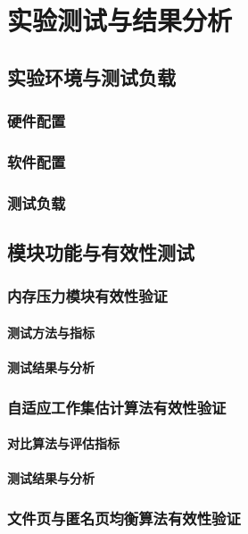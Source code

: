 \chapter{实验测试与结果分析}

\section{实验环境与测试负载}
\subsection{硬件配置}
\subsection{软件配置}
\subsection{测试负载}


\section{模块功能与有效性测试}

\subsection{内存压力模块有效性验证}
    \subsubsection{测试方法与指标}
    \subsubsection{测试结果与分析}

\subsection{自适应工作集估计算法有效性验证}
    \subsubsection{对比算法与评估指标}
    \subsubsection{测试结果与分析}

\subsection{文件页与匿名页均衡算法有效性验证}
